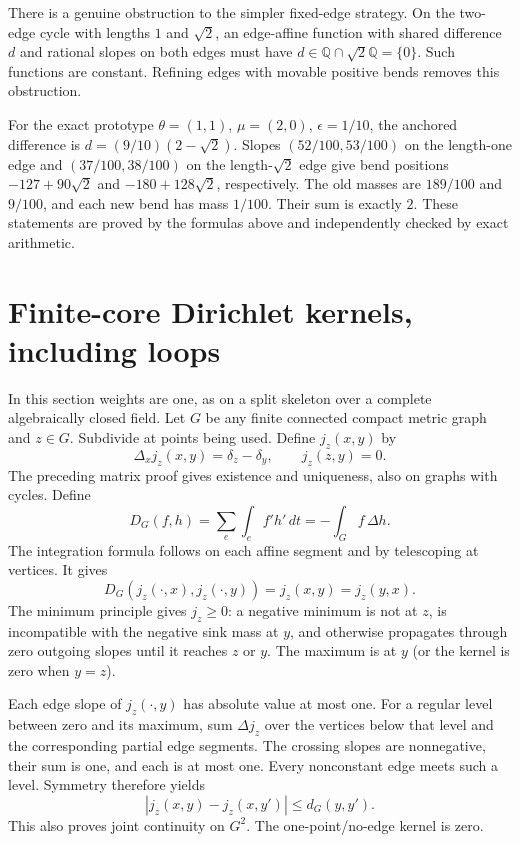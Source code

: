 \documentclass[
  11pt,
]{article}
\begin{document}
There is a genuine obstruction to the simpler fixed-edge strategy. On
the two-edge cycle with lengths \(1\) and \(\sqrt2\), an edge-affine
function with shared difference \(d\) and rational slopes on both edges
must have \(d\in\mathbb Q\cap\sqrt2\mathbb Q=\{0\}\). Such functions are
constant. Refining edges with movable positive bends removes this
obstruction.

For the exact prototype \(\theta=(1,1)\), \(\mu=(2,0)\),
\(\epsilon=1/10\), the anchored difference is \(d=(9/10)(2-\sqrt2)\).
Slopes \((52/100,53/100)\) on the length-one edge and
\((37/100,38/100)\) on the length-\(\sqrt2\) edge give bend positions
\(-127+90\sqrt2\) and \(-180+128\sqrt2\), respectively. The old masses
are \(189/100\) and \(9/100\), and each new bend has mass \(1/100\).
Their sum is exactly \(2\). These statements are proved by the formulas
above and independently checked by exact arithmetic.

\section{Finite-core Dirichlet kernels, including
loops}\label{finite-core-dirichlet-kernels-including-loops}

In this section weights are one, as on a split skeleton over a complete
algebraically closed field. Let \(G\) be any finite connected compact
metric graph and \(z\in G\). Subdivide at points being used. Define
\(j_z(x,y)\) by \[
 \Delta_xj_z(x,y)=\delta_z-\delta_y,\qquad j_z(z,y)=0.
\] The preceding matrix proof gives existence and uniqueness, also on
graphs with cycles. Define \[
 D_G(f,h)=\sum_e\int_e f'h'\,dt=-\int_Gf\,\Delta h.
\] The integration formula follows on each affine segment and by
telescoping at vertices. It gives \[
 D_G(j_z(\cdot,x),j_z(\cdot,y))=j_z(x,y)=j_z(y,x).
\] The minimum principle gives \(j_z\geq0\): a negative minimum is not
at \(z\), is incompatible with the negative sink mass at \(y\), and
otherwise propagates through zero outgoing slopes until it reaches \(z\)
or \(y\). The maximum is at \(y\) (or the kernel is zero when \(y=z\)).

Each edge slope of \(j_z(\cdot,y)\) has absolute value at most one. For
a regular level between zero and its maximum, sum \(\Delta j_z\) over
the vertices below that level and the corresponding partial edge
segments. The crossing slopes are nonnegative, their sum is one, and
each is at most one. Every nonconstant edge meets such a level. Symmetry
therefore yields \[
 |j_z(x,y)-j_z(x,y')|\leq d_G(y,y').
\] This also proves joint continuity on \(G^2\). The one-point/no-edge
kernel is zero.
\end{document}
